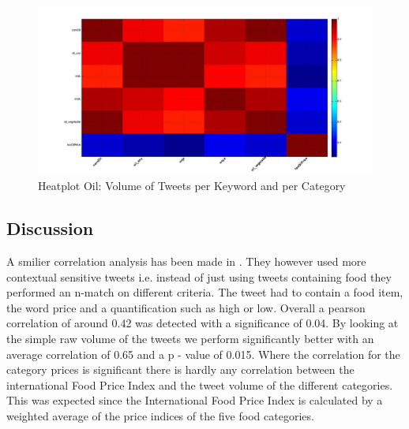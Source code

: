 \begin{figure}[H]
        \centering
         \includegraphics[width=1\textwidth ]{img/anal/oil_heatplot}
              
        \caption{Heatplot Oil: Volume of Tweets per Keyword and per Category}
        \label{fig:oil_heat}
\end{figure}


\subsection{Discussion} 

A smilier correlation analysis has been made in \cite{ungp2013}. They however used more contextual sensitive tweets i.e. instead of just using tweets containing food they performed an n-match on different criteria. The tweet had to contain a food item, the word price and a quantification such as high or low. Overall a pearson correlation of around 0.42 was detected with a significance of 0.04. By looking at the simple raw volume of the tweets we perform significantly better with an average correlation of 0.65 and a p - value of 0.015. Where the correlation for the category prices is significant there is hardly any correlation between the international Food Price Index and the tweet volume of the different categories. This was expected since the International Food Price Index is calculated by a weighted average of the price indices of the five food categories. 
 
